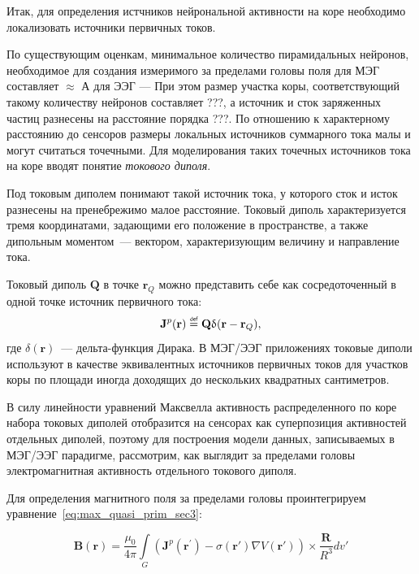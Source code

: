 Итак, для определения истчников нейрональной активности на коре необходимо локализовать источники
первичных токов.

По существующим оценкам, минимальное количество пирамидальных нейронов,
необходимое для создания измеримого за пределами головы поля для МЭГ составляет $\approx$
А для ЭЭГ ---
При этом размер участка коры, соответствующий такому количеству нейронов составляет ???,
а источник и сток заряженных частиц разнесены на расстояние порядка ???. По отношению
к характерному расстоянию до сенсоров размеры локальных
источников суммарного тока малы и могут считаться точечными.
Для моделирования таких точечных источников тока на коре вводят понятие \emph{токового диполя}.

Под токовым диполем понимают такой источник тока, у которого сток и исток разнесены на пренебрежимо малое расстояние.
Токовый диполь характеризуется тремя координатами, задающими его положение в пространстве,
а также дипольным моментом~--- вектором, характеризующим величину и направление тока.

Токовый диполь $\mathbf{Q}$ в точке $\mathbf{r}_Q$ можно представить себе как сосредоточенный
в одной точке источник первичного тока:
\begin{equation}
    \mathbf{J}^p(\mathbf{r}) \defeq \mathbf{Q}\delta(\mathbf{r} - \mathbf{r}_Q),
    \label{eq:cur_dip_def}
\end{equation}
где $\delta(\mathbf{r})$~--- дельта-функция Дирака.
В МЭГ/ЭЭГ приложениях токовые диполи используют в качестве эквивалентных источников первичных токов для
участков коры по площади иногда доходящих до нескольких квадратных сантиметров.

В силу линейности уравнений Максвелла активность распределенного по коре набора токовых
диполей отобразится на сенсорах как суперпозиция активностей отдельных диполей, поэтому
для построения модели данных, записываемых в МЭГ/ЭЭГ парадигме,
рассмотрим, как выглядит за пределами головы электромагнитная активность отдельного токового диполя.

Для определения магнитного поля за пределами головы проинтегрируем уравнение~\ref{eq:max_quasi_prim_sec3}:

\begin{equation}
    \mathbf{B}(\mathbf{r}) = \frac{\mu_0}{4\pi}\int \limits_{G} (\mathbf{J}^p(\mathbf{r}^\prime) -
    \sigma(\mathbf{r}') \nabla V(\mathbf{r}')) \times \frac{\mathbf{R}}{R^3} dv'
    \label{eq:B_integral}
\end{equation}

